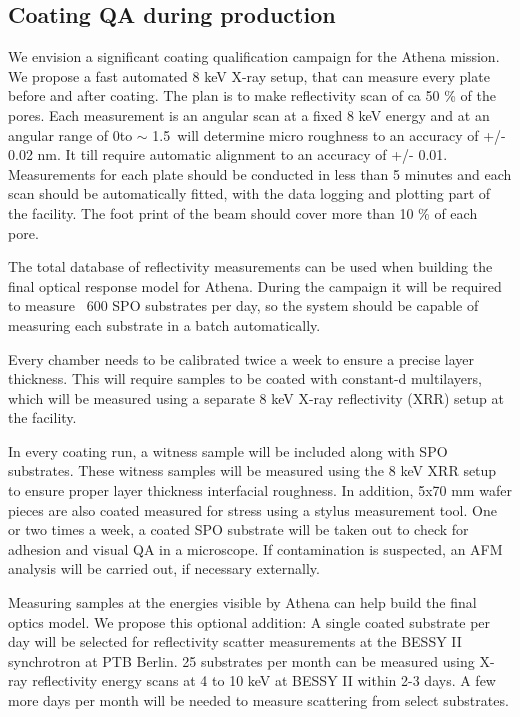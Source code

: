 \subsection{Coating QA during production}\label{qualification}
We envision a significant coating qualification campaign for the Athena mission. We propose a fast automated 8 keV X-ray setup, that can measure every plate before and after coating. The plan is to make reflectivity scan of ca 50 \% of the pores.  Each measurement is an angular scan  at a fixed 8 keV energy and at an angular range of 0\degr to $\sim$ 1.5\degr\ will determine micro roughness to an accuracy of +/- 0.02 nm. It till require automatic alignment to an accuracy of +/- 0.01\degr. Measurements for each plate should be conducted in less than 5 minutes and each scan should be automatically fitted, with the data logging and plotting part of the facility. The foot print of the beam should cover more than 10 \% of each pore.

The total database of reflectivity measurements can be used when building the final optical response model for Athena. During the campaign it will be required to measure ~600 SPO substrates per day, so the system should be capable of measuring each substrate in a batch automatically.

Every chamber needs to be calibrated twice a week to ensure a precise layer thickness. This will require samples to be coated with constant-d multilayers, which will be measured using a separate 8 keV X-ray reflectivity (XRR) setup at the facility.

In every coating run, a witness sample will be included along with SPO substrates. These witness samples will be measured using the 8 keV XRR setup to ensure proper layer thickness interfacial roughness. In addition, 5x70 mm wafer pieces are also coated measured for stress using a stylus measurement tool. One or two times a week, a coated SPO substrate will be taken out to check for adhesion and visual QA in a microscope. If contamination is suspected, an AFM analysis will be carried out, if necessary externally.

Measuring samples at the energies visible by Athena can help build the final optics model. We propose this optional addition: A single coated substrate per day will be selected for reflectivity scatter measurements at the BESSY II synchrotron at PTB Berlin. 25 substrates per month can be measured using X-ray reflectivity energy scans at 4 to 10 keV at BESSY II within 2-3 days. A few more days per month will be needed to measure scattering from select substrates.


